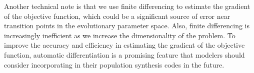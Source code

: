 \documentclass[twocolumn]{aastex631}
\begin{document}


Another technical note is that we use finite differencing to estimate the gradient of the objective function, which could be a significant source of error near transition points in the evolutionary parameter space.
Also, finite differencing is increasingly inefficient as we increase the dimensionality of the problem.
To improve the accuracy and efficiency in estimating the gradient of the objective function, automatic differentiation is a promising feature that modelers should consider incorporating in their population synthesis codes in the future.
\end{document}
